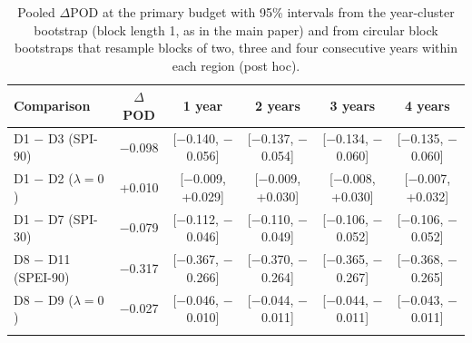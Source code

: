 \begin{table}[tbp]
\caption{Pooled $\Delta$POD at the primary budget with 95\% intervals from the year-cluster bootstrap (block
length 1, as in the main paper) and from circular block bootstraps that resample blocks of two, three and
four consecutive years within each region (post hoc).}
\label{tab:blockboot}
\footnotesize\setlength{\tabcolsep}{3pt}
\begin{tabular*}{\textwidth}{@{\extracolsep\fill}lccccc}
\toprule
Comparison & $\Delta$POD & 1 year & 2 years & 3 years & 4 years\\
\midrule
D1 $-$ D3 (SPI-90) & $-$0.098 & [$-$0.140, $-$0.056] & [$-$0.137, $-$0.054] & [$-$0.134, $-$0.060] & [$-$0.135, $-$0.060] \\
D1 $-$ D2 ($\lambda=0$) & +0.010 & [$-$0.009, +0.029] & [$-$0.009, +0.030] & [$-$0.008, +0.030] & [$-$0.007, +0.032] \\
D1 $-$ D7 (SPI-30) & $-$0.079 & [$-$0.112, $-$0.046] & [$-$0.110, $-$0.049] & [$-$0.106, $-$0.052] & [$-$0.106, $-$0.052] \\
D8 $-$ D11 (SPEI-90) & $-$0.317 & [$-$0.367, $-$0.266] & [$-$0.370, $-$0.264] & [$-$0.365, $-$0.267] & [$-$0.368, $-$0.265] \\
D8 $-$ D9 ($\lambda=0$) & $-$0.027 & [$-$0.046, $-$0.010] & [$-$0.044, $-$0.011] & [$-$0.044, $-$0.011] & [$-$0.043, $-$0.011] \\
\botrule
\end{tabular*}
\end{table}
